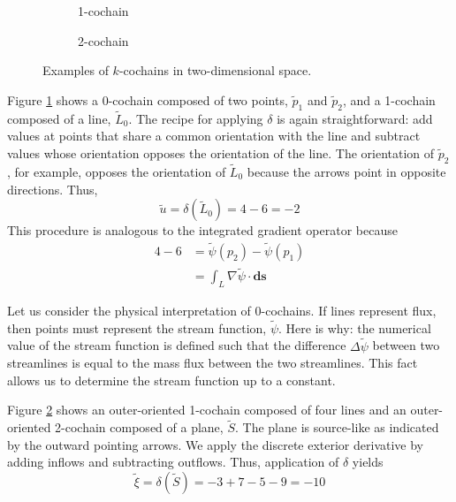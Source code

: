\begin{figure}[ht]
\begin{subfigure}[c]{0.3\textwidth}
{
            \vfill
        }
        \caption{1-cochain}
        \label{fig:outer1CochainExample}
    \end{subfigure}
    \begin{subfigure}[c]{0.3\textwidth}
        \centering
        \usebox{\boxOuterExample}
        \caption{2-cochain}
        \label{fig:outer2CochainExample}
    \end{subfigure}
    \caption{Examples of $k$-cochains in two-dimensional space.}
    \label{fig:outerCochainExamples}
\end{figure}

Figure \ref{fig:outer1CochainExample} shows a 0-cochain composed of two points, $\tilde{p}_1$ and $\tilde{p}_2$, and a 1-cochain composed of a line, $\tilde{L}_0$. The recipe for applying $\delta$ is again  straightforward: add values at points that share a common orientation with the line and subtract values whose orientation opposes the orientation of the line. The orientation of $\tilde{p}_2$, for example, opposes the orientation of $\tilde{L}_0$ because the arrows point in opposite directions. Thus,\begin{equation}
    \tilde{u} = \delta(\tilde{L}_0) = 4 - 6 = -2
\end{equation}
This procedure is analogous to the integrated gradient operator because
\begin{equation}
    \begin{split}
        4 - 6 &= \tilde{\psi}(p_2) - \tilde{\psi}(p_1) \\
        &= \int_{L} \nabla \tilde{\psi} \cdot \mathbf{ds}
    \end{split}
\end{equation}

Let us consider the physical interpretation of 0-cochains. If lines represent flux, then points must represent the stream function, $\tilde{\psi}$. Here is why: the numerical value of the stream function is defined such that the difference $\Delta \tilde{\psi}$ between two streamlines is equal to the mass flux between the two streamlines. This fact allows us to determine the stream function up to a constant.

Figure \ref{fig:outer2CochainExample} shows an outer-oriented 1-cochain composed of four lines and an outer-oriented 2-cochain composed of a plane, $\tilde{S}$. The plane is source-like as indicated by the outward pointing arrows. We apply the discrete exterior derivative by adding inflows and subtracting outflows. Thus, application of $\delta$ yields
\begin{equation}
    \tilde{\xi} = \delta(\tilde{S}) = -3 + 7 - 5 - 9 = -10
\end{equation}

